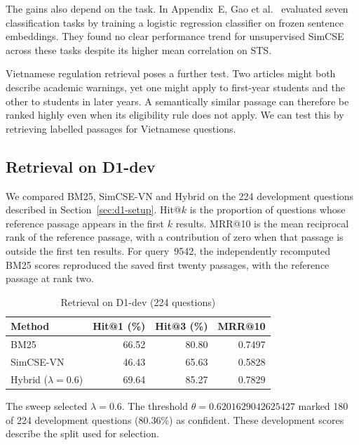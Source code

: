 The gains also depend on the task. In Appendix~E, Gao et
al.~\cite{gao-etal-2021-simcse} evaluated seven classification tasks by
training a logistic regression classifier on frozen sentence embeddings.
They found no clear performance trend for unsupervised SimCSE across
these tasks despite its higher mean correlation on STS.

Vietnamese regulation retrieval poses a further test. Two articles might both describe academic
warnings, yet one might apply to first-year students and the other to
students in later years. A semantically similar passage can therefore
be ranked highly even when its eligibility rule does not apply. We can test this
by retrieving labelled passages for Vietnamese questions.

\subsection{Retrieval on D1-dev}
\label{sec:d1-dev-results}
We compared BM25, SimCSE-VN and Hybrid on the 224 development questions described in
Section~\ref{sec:d1-setup}. Hit@$k$ is the proportion of questions whose
reference passage appears in the first $k$ results. MRR@10 is the mean
reciprocal rank of the reference passage, with a contribution of zero when
that passage is outside the first ten results.
For query~9542, the independently recomputed BM25 scores reproduced the
saved first twenty passages, with the reference passage at rank two.

\begin{table}[htbp]
\caption{Retrieval on D1-dev (224 questions)}
\label{tab:d1-dev-dense}
\centering\footnotesize
\begin{tabular}{@{}lrrr@{}}
\hline
Method & Hit@1 (\%) & Hit@3 (\%) & MRR@10 \\
\hline
BM25 & 66.52 & 80.80 & 0.7497 \\
SimCSE-VN & 46.43 & 65.63 & 0.5828 \\
Hybrid ($\lambda=0.6$) & 69.64 & 85.27 & 0.7829 \\
\hline
\end{tabular}
\end{table}

The sweep selected $\lambda=0.6$. The threshold $\theta=0.6201629042625427$
marked 180 of 224 development questions (80.36\%) as confident. These
development scores describe the split used for selection.

